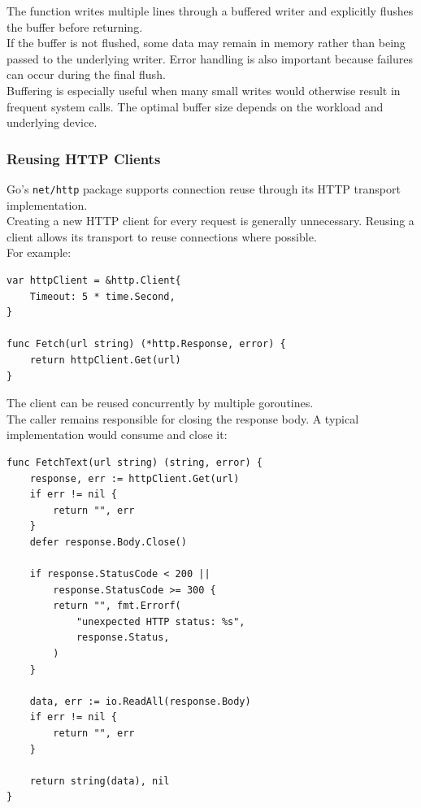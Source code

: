 The function writes multiple lines through a buffered writer and explicitly flushes the buffer before returning.\\

If the buffer is not flushed, some data may remain in memory rather than being passed to the underlying writer. Error handling is also important because failures can occur during the final flush.\\

Buffering is especially useful when many small writes would otherwise result in frequent system calls. The optimal buffer size depends on the workload and underlying device.

\subsubsection{Reusing HTTP Clients}

Go's \texttt{net/http} package supports connection reuse through its HTTP transport implementation.\\

Creating a new HTTP client for every request is generally unnecessary. Reusing a client allows its transport to reuse connections where possible.\\

For example:

\begin{lstlisting}
var httpClient = &http.Client{
    Timeout: 5 * time.Second,
}

func Fetch(url string) (*http.Response, error) {
    return httpClient.Get(url)
}
\end{lstlisting}

The client can be reused concurrently by multiple goroutines.\\

The caller remains responsible for closing the response body. A typical implementation would consume and close it:

\begin{lstlisting}
func FetchText(url string) (string, error) {
    response, err := httpClient.Get(url)
    if err != nil {
        return "", err
    }
    defer response.Body.Close()

    if response.StatusCode < 200 ||
        response.StatusCode >= 300 {
        return "", fmt.Errorf(
            "unexpected HTTP status: %s",
            response.Status,
        )
    }

    data, err := io.ReadAll(response.Body)
    if err != nil {
        return "", err
    }

    return string(data), nil
}
\end{lstlisting}

